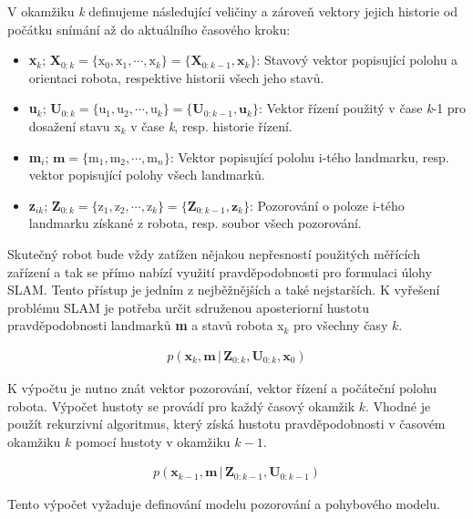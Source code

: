 \documentclass[12pt,a4paper]{article}
\begin{document}
V okamžiku \textit{k} definujeme následující veličiny a zároveň vektory jejich historie od počátku snímání až do aktuálního časového kroku:
\begin{itemize}
\item \textbf{x}$_k$; \textbf{X}$_{0:k}=\lbrace \text{x}_0, \text{x}_1,\cdots, \text{x}_k\rbrace = \lbrace \textbf{X}_{0:k-1}, \textbf{x}_k \rbrace$:  
Stavový vektor popisující polohu a orientaci robota, respektive  historii všech jeho stavů.
\item \textbf{u}$_k$; \textbf{U}$_{0:k}=\lbrace \text{u}_1, \text{u}_2,\cdots, \text{u}_k\rbrace = \lbrace \textbf{U}_{0:k-1}, \textbf{u}_k \rbrace$: 
Vektor řízení použitý v čase \textit{k}-1 pro dosažení stavu x$_k$ v čase \textit{k}, resp. historie řízení.
\item \textbf{m}$_i$; $\textbf{m}=\lbrace \text{m}_1, \text{m}_2,\cdots, \text{m}_n\rbrace$: 
Vektor popisující polohu i-tého landmarku, resp. vektor popisující polohy všech landmarků.
\item \textbf{z}$_{ik}$; \textbf{Z}$_{0:k}=\lbrace \text{z}_1, \text{z}_2,\cdots, \text{z}_k\rbrace = \lbrace \textbf{Z}_{0:k-1}, \textbf{z}_k \rbrace$: 
Pozorování o poloze i-tého landmarku získané z robota, resp. soubor všech pozorování.
\end{itemize}

Skutečný robot bude vždy zatížen nějakou nepřesností použitých měřících zařízení a tak se přímo nabízí využití pravděpodobnosti pro formulaci úlohy SLAM. Tento přístup je jedním z nejběžnějších a také nejstarších. K vyřešení problému SLAM je potřeba určit sdruženou aposteriorní hustotu pravděpodobnosti landmarků \textbf{m} a stavů robota x$_k$ pro všechny časy $k$.

\begin{eqnarray}
p(\textbf{x}_k, \textbf{m} \,|\, \textbf{Z}_{0:k}, \textbf{U}_{0:k}, \textbf{x}_0)
\end{eqnarray}

K výpočtu je nutno znát vektor pozorování, vektor řízení a počáteční polohu robota. Výpočet hustoty se provádí pro každý časový okamžik $k$. Vhodné je použít rekurzivní algoritmus, který získá hustotu pravděpodobnosti v časovém okamžiku $k$ pomocí hustoty v okamžiku $k-1$.

\begin{eqnarray}
p(\textbf{x}_{k-1}, \textbf{m} \,|\, \textbf{Z}_{0:k-1}, \textbf{U}_{0:k-1})
\end{eqnarray}

Tento výpočet vyžaduje definování modelu pozorování a pohybového modelu.
\end{document}
